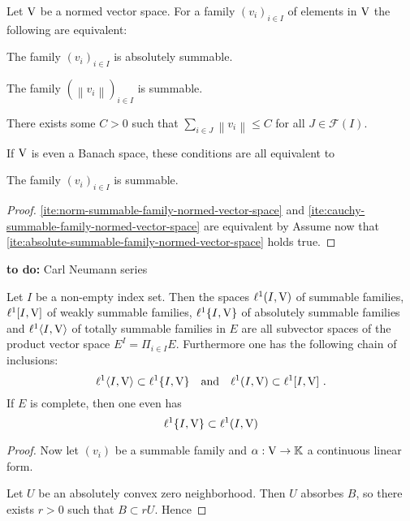 
\begin{proposition}\label{thm:summability-criteria-family--normed-vector-space}
  Let $\mathrm{V}$ be a normed vector space. 
  For a  family $(v_i)_{i\in I}$ of elements in $\mathrm{V}$ the following are equivalent:
  \begin{romanlist}
  \item\label{ite:absolute-summable-family-normed-vector-space} The family $(v_i)_{i\in I}$ is absolutely summable. 
  \item\label{ite:norm-summable-family-normed-vector-space} The family $(\left\| v_i \right\| )_{i\in I}$ is summable.
  \item\label{ite:cauchy-summable-family-normed-vector-space} There exists some $C > 0$ such that 
        $\sum_{i\in J}\left\| v_i \right\| \leq C$ for all $J\in \mathscr{F} (I)$.
  \end{romanlist}
  If $\mathrm{V}$ is even a Banach space, these conditions are all equivalent to 
  \begin{romanlist}
  \setcounter{enumi}{3}
  \item The family $(v_i)_{i\in I}$ is summable.
  \end{romanlist}
\end{proposition}
\begin{proof}
  \ref{ite:norm-summable-family-normed-vector-space} and \ref{ite:cauchy-summable-family-normed-vector-space}
  are equivalent by 
  Assume now that \ref{ite:absolute-summable-family-normed-vector-space} holds true. 
\end{proof}


\textbf{to do:} Carl Neumann series



\begin{theorem}
  Let $I$ be a non-empty index set. Then the spaces $\ell^1 (I, \mathrm{V} )$ of summable families, 
  $\ell^1 [I, \mathrm{V} ]$ of weakly summable families, $\ell^1 \{I, \mathrm{V} \}$ of absolutely summable families and
  $\ell^1 \langle I, \mathrm{V} \rangle$ of totally summable families in $E$ are all subvector spaces of 
  the product vector space $E^I = \Pi_{i\in I} E$.   Furthermore one has the following chain of inclusions:
  \[
     \ell^1 \langle I, \mathrm{V} \rangle\subset\ell^1 \{I, \mathrm{V} \}   \quad\text{and} \quad \ell^1 (I, \mathrm{V}) \subset \ell^1 [I, \mathrm{V} ] \ .
  \] 
  If $E$ is complete, then one even has 
   \[
        \ell^1 \{I, \mathrm{V} \}   \subset \ell^1 (I, \mathrm{V})     
   \]
\end{theorem}

\begin{proof}
    Now let $(v_i)$ be a summable family and $\alpha : \mathrm{V} \to \mathbb{K}$ a continuous linear form. 

 Let $U$ be an absolutely convex zero neighborhood. Then $U$ absorbes $B$, so there exists $r>0$ such that
 $B \subset rU$. Hence
\end{proof}


